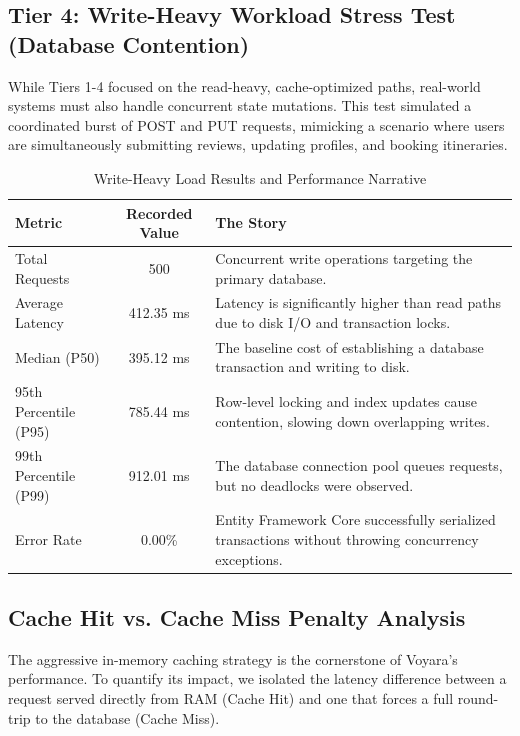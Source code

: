\subsection{Tier 4: Write-Heavy Workload Stress Test (Database Contention)}
While Tiers 1-4 focused on the read-heavy, cache-optimized paths, real-world systems must also handle concurrent state mutations. This test simulated a coordinated burst of POST and PUT requests, mimicking a scenario where users are simultaneously submitting reviews, updating profiles, and booking itineraries.

\begin{table}[H]
\centering
\renewcommand{\arraystretch}{1.3}
\begin{tabular}{|l|c|p{8cm}|}
\hline
\textbf{Metric} & \textbf{Recorded Value} & \textbf{The Story} \\ \hline
Total Requests & 500 & Concurrent write operations targeting the primary database. \\ \hline
Average Latency & 412.35 ms & Latency is significantly higher than read paths due to disk I/O and transaction locks. \\ \hline
Median (P50) & 395.12 ms & The baseline cost of establishing a database transaction and writing to disk. \\ \hline
95th Percentile (P95) & 785.44 ms & Row-level locking and index updates cause contention, slowing down overlapping writes. \\ \hline
99th Percentile (P99) & 912.01 ms & The database connection pool queues requests, but no deadlocks were observed. \\ \hline
Error Rate & 0.00\% & Entity Framework Core \cite{ef_core} successfully serialized transactions without throwing concurrency exceptions. \\ \hline
\end{tabular}
\caption{Write-Heavy Load Results and Performance Narrative}
\label{tab:write_heavy_load}
\end{table}

\subsection{Cache Hit vs. Cache Miss Penalty Analysis}
The aggressive in-memory caching strategy is the cornerstone of Voyara's performance. To quantify its impact, we isolated the latency difference between a request served directly from RAM (Cache Hit) and one that forces a full round-trip to the database (Cache Miss).

